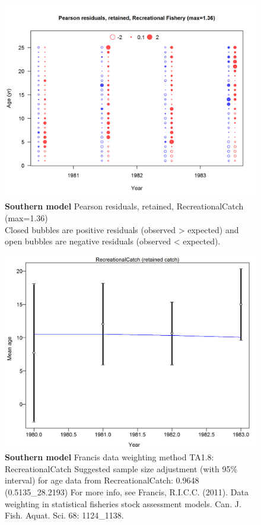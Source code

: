 \documentclass[12pt,]{article}
\begin{document}
\begin{figure}[htbp]
\centering
\includegraphics{./r4ss/plots_mod2/comp_agefit_residsflt1mkt2.png}
\caption{\textbf{Southern model} Pearson residuals, retained,
RecreationalCatch (max=1.36)\\
Closed bubbles are positive residuals (observed \textgreater{} expected)
and open bubbles are negative residuals (observed \textless{} expected).
\label{fig:mod2_2_comp_agefit_residsflt1mkt2}}
\end{figure}

\begin{figure}[htbp]
\centering
\includegraphics{./r4ss/plots_mod2/comp_agefit_data_weighting_TA1.8_RecreationalCatch.png}
\caption{\textbf{Southern model} Francis data weighting method TA1.8:
RecreationalCatch Suggested sample size adjustment (with 95\% interval)
for age data from RecreationalCatch: 0.9648 (0.5135\_28.2193) For more
info, see Francis, R.I.C.C. (2011). Data weighting in statistical
fisheries stock assessment models. Can. J. Fish. Aquat. Sci. 68:
1124\_1138.
\label{fig:mod2_4_comp_agefit_data_weighting_TA1.8_RecreationalCatch}}
\end{figure}
\end{document}
